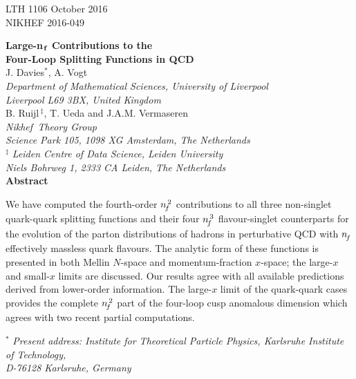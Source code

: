 \documentclass[12pt]{article}
\begin{document}
\begin{titlepage}
\noindent
LTH 1106  \hfill October 2016\\[0.5mm]
NIKHEF 2016-049 \\
\vspace{1.2cm}
%
\begin{center}
{\Large \bf Large-n$_{\:\!\bf f}$ Contributions to the}\\
\vspace{0.3cm}
%
{\Large \bf Four-Loop Splitting Functions in QCD}\\ 
\vspace{2.0cm}
%
{\large J. Davies$^\ast$,  A. Vogt}\\
\vspace{0.4cm}
{\it Department of Mathematical Sciences, University of Liverpool\\
\vspace{0.5mm}
Liverpool L69 3BX, United Kingdom}\\
%
\vspace{1.2cm}
{\large B. Ruijl$^{\:\!\ddagger}$, T. Ueda and J.A.M. Vermaseren}\\
\vspace{0.4cm}
%
{\it Nikhef$\,$ Theory Group \\
\vspace{0.5mm}
Science Park 105, 1098 XG Amsterdam, The Netherlands} \\
\vspace{0.3cm}
$^\ddagger$ {\it Leiden Centre of Data Science, Leiden University \\
\vspace{0.5mm}
Niels Bohrweg 1, 2333 CA Leiden, The Netherlands}\\
\vspace{2.5cm}
%
{\large \bf Abstract}
\vspace{-0.2cm}
\end{center}
%
We have computed the fourth-order ${n^{\,2}_{\! f}}$ contributions to all three non-singlet
quark-quark splitting functions and their four ${n^{\,3}_{\! f}}$ flavour-singlet 
counterparts for the evolution of the parton distributions of hadrons in 
perturbative QCD with ${n^{}_{\! f}}$ effectively massless quark flavours. The analytic 
form of these functions is presented in both Mellin $N$-space and 
momentum-fraction $x$-space; the \mbox{large-$x$} and small-$x$ limits are 
discussed.  Our results agree with all available predictions derived from 
lower-order information.  The large-$x$ limit of the quark-quark cases provides
the complete ${n^{\,2}_{\! f}}$ part of the four-loop cusp anomalous dimension which agrees
with two recent partial computations.

\vspace{1cm}
\noindent
$^\ast$ {\it Present address: Institute for Theoretical Particle Physics, 
Karlsruhe Institute of Technology, 
\\ \hspace*{3.1cm}D-76128 Karlsruhe, Germany}
\end{titlepage}
%
%
\end{document}
